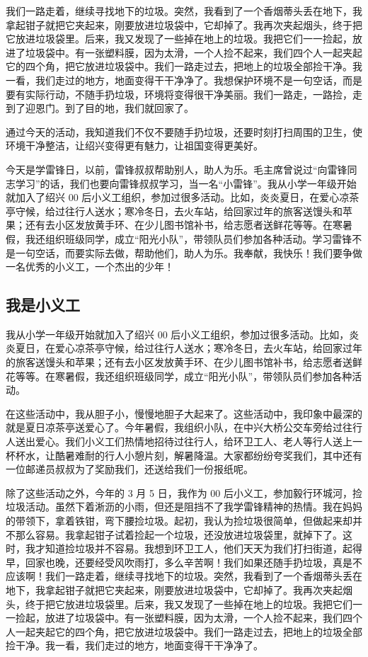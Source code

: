 \documentclass[UTF8,a4paper,titlepage,twoside,10.5pt]{article}
\begin{document}
我们一路走着，继续寻找地下的垃圾。突然，我看到了一个香烟蒂头丢在地下，我拿起钳子就把它夹起来，刚要放进垃圾袋中，它却掉了。我再次夹起烟头，终于把它放进垃圾袋里。后来，我又发现了一些掉在地上的垃圾。我把它们一一捡起，放进了垃圾袋中。有一张塑料膜，因为太滑，一个人捡不起来，我们四个人一起夹起它的四个角，把它放进垃圾袋中。我们一路走过去，把地上的垃圾全部捡干净。我一看，我们走过的地方，地面变得干干净净了。我想保护环境不是一句空话，而是要有实际行动，不随手扔垃圾，环境将变得很干净美丽。我们一路走，一路捡，走到了迎恩门。到了目的地，我们就回家了。

通过今天的活动，我知道我们不仅不要随手扔垃圾，还要时刻打扫周围的卫生，使环境干净整洁，让绍兴变得更有魅力，让祖国变得更美好。

今天是学雷锋日，以前，雷锋叔叔帮助别人，助人为乐。毛主席曾说过“向雷锋同志学习”的话，我们也要向雷锋叔叔学习，当一名“小雷锋”。我从小学一年级开始就加入了绍兴 00 后小义工组织，参加过很多活动。比如，炎炎夏日，在爱心凉茶亭守候，给过往行人送水；寒冷冬日，去火车站，给回家过年的旅客送馒头和苹果；还有去小区发放黄手环、在少儿图书馆补书，给志愿者送鲜花等等。在寒暑假，我还组织班级同学，成立“阳光小队”，带领队员们参加各种活动。学习雷锋不是一句空话，而要实际去做，帮助他们，助人为乐。我奉献，我快乐！我们要争做一名优秀的小义工，一个杰出的少年！

\subsection{我是小义工}
\label{sec:org8286a4d}

我从小学一年级开始就加入了绍兴 00 后小义工组织，参加过很多活动。比如，炎炎夏日，在爱心凉茶亭守候，给过往行人送水；寒冷冬日，去火车站，给回家过年的旅客送馒头和苹果；还有去小区发放黄手环、在少儿图书馆补书，给志愿者送鲜花等等。在寒暑假，我还组织班级同学，成立“阳光小队”，带领队员们参加各种活动。

在这些活动中，我从胆子小，慢慢地胆子大起来了。这些活动中，我印象中最深的就是夏日凉茶亭送爱心了。今年暑假，我组织小队，在中兴大桥公交车旁给过往行人送出爱心。我们小义工们热情地招待过往行人，给环卫工人、老人等行人送上一杯杯水，让酷暑难耐的行人小憩片刻，解暑降温。大家都纷纷夸奖我们，其中还有一位邮递员叔叔为了奖励我们，还送给我们一份报纸呢。

除了这些活动之外，今年的 3 月 5 日，我作为 00 后小义工，参加毅行环城河，捡垃圾活动。虽然下着淅沥的小雨，但还是阻挡不了我学雷锋精神的热情。我在妈妈的带领下，拿着铁钳，弯下腰捡垃圾。起初，我认为捡垃圾很简单，但做起来却并不那么容易。我拿起钳子试着捡起一个垃圾，还没放进垃圾袋里，就掉下了。这时，我才知道捡垃圾并不容易。我想到环卫工人，他们天天为我们打扫街道，起得早，回家也晚，还要经受风吹雨打，多么辛苦啊！我们如果还随手扔垃圾，真是不应该啊！我们一路走着，继续寻找地下的垃圾。突然，我看到了一个香烟蒂头丢在地下，我拿起钳子就把它夹起来，刚要放进垃圾袋中，它却掉了。我再次夹起烟头，终于把它放进垃圾袋里。后来，我又发现了一些掉在地上的垃圾。我把它们一一捡起，放进了垃圾袋中。有一张塑料膜，因为太滑，一个人捡不起来，我们四个人一起夹起它的四个角，把它放进垃圾袋中。我们一路走过去，把地上的垃圾全部捡干净。我一看，我们走过的地方，地面变得干干净净了。
\end{document}
